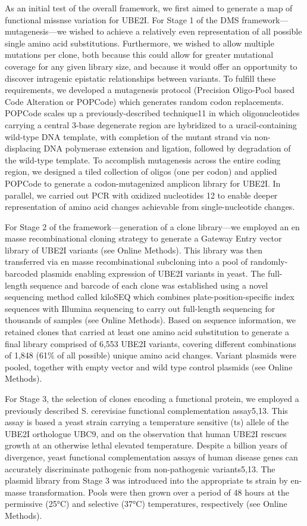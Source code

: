As an initial test of the overall framework, we first aimed to generate a map of functional missnse variation for UBE2I. For Stage 1 of the DMS framework---mutagenesis---we wished to achieve a relatively even representation of all possible single amino acid substitutions.  Furthermore, we wished to allow multiple mutations per clone, both because this could allow for greater mutational coverage for any given library size, and because it would offer an opportunity to discover intragenic epistatic relationships between variants.  To fulfill these requirements, we developed a mutagenesis protocol (Precision Oligo-Pool based Code Alteration or POPCode) which generates random codon replacements. POPCode scales up a previously-described technique11 in which oligonucleotides carrying a central 3-base degenerate region are hybridized to a uracil-containing wild-type DNA template, with completion of the mutant strand via non-displacing DNA polymerase extension and ligation, followed by degradation of the wild-type template.  To accomplish mutagenesis across the entire coding region, we designed a tiled collection of oligos (one per codon) and applied POPCode to generate a codon-mutagenized amplicon library for UBE2I.  In parallel, we carried out PCR with oxidized nucleotides 12 to enable deeper representation of amino acid changes achievable from single-nucleotide changes.

For Stage 2 of the framework---generation of a clone library---we employed an en masse recombinational cloning strategy to generate a Gateway Entry vector library of UBE2I variants (see Online Methods). This library was then transferred via en masse recombinational subcloning into a pool of randomly-barcoded plasmids enabling expression of UBE2I variants in yeast. The full-length sequence and barcode of each clone was established using a novel sequencing method called kiloSEQ which combines plate-position-specific index sequences with Illumina sequencing to carry out full-length sequencing for thousands of samples (see Online Methods). Based on sequence information, we retained clones that carried at least one amino acid substitution to generate a final library comprised of 6,553 UBE2I variants, covering different combinations of 1,848 (61\% of all possible) unique amino acid changes. Variant plasmids were pooled, together with empty vector and wild type control plasmids (see Online Methods).

For Stage 3, the selection of clones encoding a functional protein, we employed a previously described S. cerevisiae functional complementation assay5,13. This assay is based a yeast strain carrying a temperature sensitive (ts) allele of the UBE2I orthologue UBC9, and on the observation that human UBE2I rescues growth at an otherwise lethal elevated temperature.  Despite a billion years of divergence, yeast functional complementation assays of human disease genes can accurately discriminate pathogenic from non-pathogenic variants5,13.  The plasmid library from Stage 3 was introduced into the appropriate ts strain by en-masse transformation. Pools were then grown over a period of 48 hours at the permissive (25°C) and selective (37°C) temperatures, respectively (see Online Methods).

